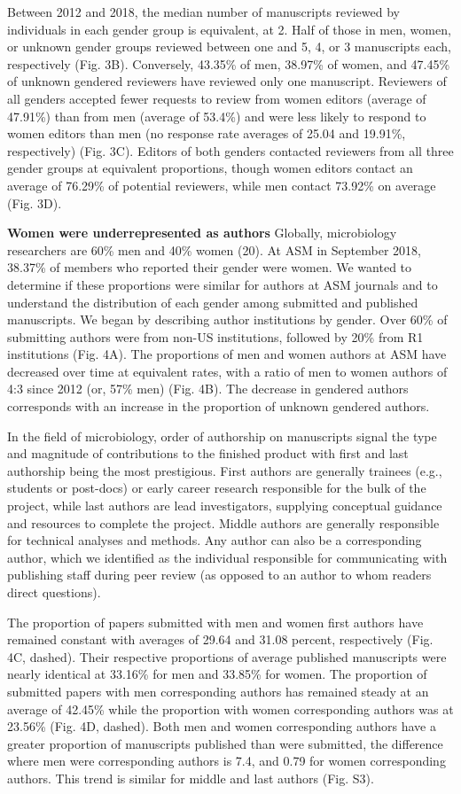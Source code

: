 \documentclass[11pt,]{article}
\begin{document}
Between 2012 and 2018, the median number of manuscripts reviewed by
individuals in each gender group is equivalent, at 2. Half of those in
men, women, or unknown gender groups reviewed between one and 5, 4, or 3
manuscripts each, respectively (Fig. 3B). Conversely, 43.35\% of men,
38.97\% of women, and 47.45\% of unknown gendered reviewers have
reviewed only one manuscript. Reviewers of all genders accepted fewer
requests to review from women editors (average of 47.91\%) than from men
(average of 53.4\%) and were less likely to respond to women editors
than men (no response rate averages of 25.04 and 19.91\%, respectively)
(Fig. 3C). Editors of both genders contacted reviewers from all three
gender groups at equivalent proportions, though women editors contact an
average of 76.29\% of potential reviewers, while men contact 73.92\% on
average (Fig. 3D).

\textbf{Women were underrepresented as authors} Globally, microbiology
researchers are 60\% men and 40\% women (20). At ASM in September 2018,
38.37\% of members who reported their gender were women. We wanted to
determine if these proportions were similar for authors at ASM journals
and to understand the distribution of each gender among submitted and
published manuscripts. We began by describing author institutions by
gender. Over 60\% of submitting authors were from non-US institutions,
followed by 20\% from R1 institutions (Fig. 4A). The proportions of men
and women authors at ASM have decreased over time at equivalent rates,
with a ratio of men to women authors of 4:3 since 2012 (or, 57\% men)
(Fig. 4B). The decrease in gendered authors corresponds with an increase
in the proportion of unknown gendered authors.

In the field of microbiology, order of authorship on manuscripts signal
the type and magnitude of contributions to the finished product with
first and last authorship being the most prestigious. First authors are
generally trainees (e.g., students or post-docs) or early career
research responsible for the bulk of the project, while last authors are
lead investigators, supplying conceptual guidance and resources to
complete the project. Middle authors are generally responsible for
technical analyses and methods. Any author can also be a corresponding
author, which we identified as the individual responsible for
communicating with publishing staff during peer review (as opposed to an
author to whom readers direct questions).

The proportion of papers submitted with men and women first authors have
remained constant with averages of 29.64 and 31.08 percent, respectively
(Fig. 4C, dashed). Their respective proportions of average published
manuscripts were nearly identical at 33.16\% for men and 33.85\% for
women. The proportion of submitted papers with men corresponding authors
has remained steady at an average of 42.45\% while the proportion with
women corresponding authors was at 23.56\% (Fig. 4D, dashed). Both men
and women corresponding authors have a greater proportion of manuscripts
published than were submitted, the difference where men were
corresponding authors is 7.4, and 0.79 for women corresponding authors.
This trend is similar for middle and last authors (Fig. S3).
\end{document}
